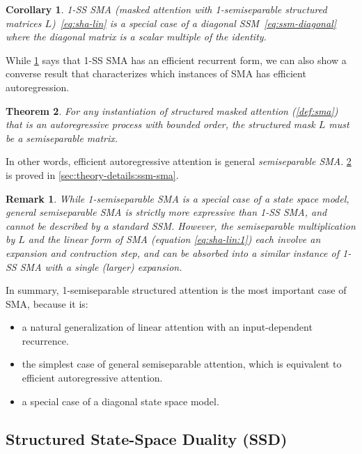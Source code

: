 \documentclass{article}
\newtheorem{theorem}{Theorem}[section]
\newtheorem{corollary}[theorem]{Corollary}
\newtheorem{remark}{Remark}
\begin{document}
\begin{corollary}
  \label{cor:1ss-sma}
  1-SS SMA (masked attention with 1-semiseparable structured matrices $L$)~\eqref{eq:sha-lin} is a special case of a diagonal SSM~\eqref{eq:ssm-diagonal} where the diagonal matrix is a scalar multiple of the identity.
\end{corollary}

While \cref{cor:1ss-sma} says that 1-SS SMA has an efficient recurrent form,
we can also show a converse result that characterizes which instances of SMA has efficient autoregression.
\begin{theorem}
  \label{thm:ss-sma}
  For any instantiation of structured masked attention (\cref{def:sma}) that is an autoregressive process with bounded order,
  the structured mask $L$ must be a semiseparable matrix.
\end{theorem}
In other words, efficient autoregressive attention is general \emph{semiseparable SMA}.
\cref{thm:ss-sma} is proved in \cref{sec:theory-details:ssm-sma}.

\begin{remark}
  While 1-semiseparable SMA is a special case of a state space model,
  general semiseparable SMA is strictly more expressive than 1-SS SMA, and cannot be described by a standard SSM.
  However, the semiseparable multiplication by $L$ and the linear form of SMA (equation \eqref{eq:sha-lin:1}) each involve an expansion and contraction step, and can be absorbed into a similar instance of 1-SS SMA with a single (larger) expansion.
\end{remark}

In summary, 1-semiseparable structured attention is the most important case of SMA, because it is:
\begin{itemize}
  \item a natural generalization of linear attention with an input-dependent recurrence.
  \item the simplest case of general semiseparable attention, which is equivalent to efficient autoregressive attention.
  \item a special case of a diagonal state space model.
\end{itemize}

\subsection{Structured State-Space Duality (SSD)}
\label{sec:ssd:ssd}
\end{document}
